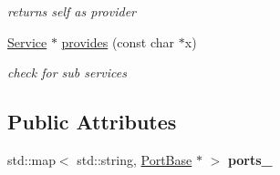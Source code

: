 \begin{DoxyCompactItemize}
\begin{DoxyCompactList}\small\item\em returns self as provider \end{DoxyCompactList}\item 
\hypertarget{classcoco_1_1_service_ad51597fb90860e9a9414ea70c1dffec9}{\hyperlink{classcoco_1_1_service}{Service} $\ast$ \hyperlink{classcoco_1_1_service_ad51597fb90860e9a9414ea70c1dffec9}{provides} (const char $\ast$x)}\label{classcoco_1_1_service_ad51597fb90860e9a9414ea70c1dffec9}

\begin{DoxyCompactList}\small\item\em check for sub services \end{DoxyCompactList}\end{DoxyCompactItemize}
\subsection*{Public Attributes}
\begin{DoxyCompactItemize}
\item 
\hypertarget{classcoco_1_1_service_a548c23cff551beb95fd53232e8f2bc33}{std\-::map$<$ std\-::string, \hyperlink{classcoco_1_1_port_base}{Port\-Base} $\ast$ $>$ {\bfseries ports\-\_\-}}\label{classcoco_1_1_service_a548c23cff551beb95fd53232e8f2bc33}

\end{DoxyCompactItemize}
